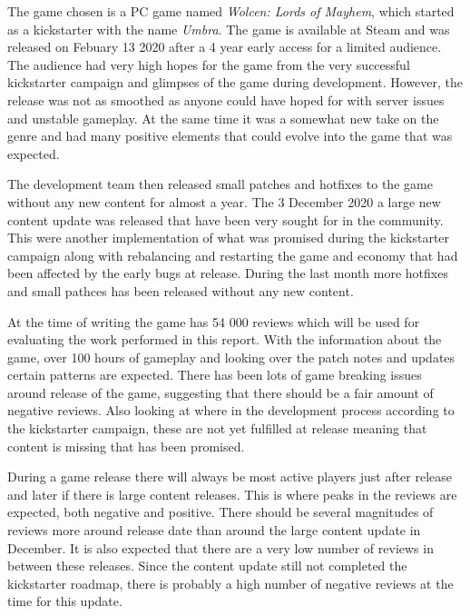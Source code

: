 The game chosen is a PC game named \emph{Wolcen: Lords of Mayhem}, which started as a kickstarter with the name \emph{Umbra}. \cite{kickstarter} 
The game is available at Steam \cite{wolcen} and was released on Febuary 13 2020 after a 4 year early access for a limited audience. 
The audience had very high hopes for the game from the very successful kickstarter campaign and glimpses of the game during development. 
However, the release was not as smoothed as anyone could have hoped for with server issues and unstable gameplay. 
At the same time it was a somewhat new take on the genre and had many positive elements that could evolve into the game that was expected. 


The development team then released small patches and hotfixes to the game without any new content for almost a year. 
The 3 December 2020 a large new content update was released that have been very sought for in the community. 
This were another implementation of what was promised during the kickstarter campaign along with rebalancing and restarting the game and economy that had been affected by the early bugs at release. During the last month more hotfixes and small pathces has been released without any new content.

At the time of writing the game has 54 000 reviews which will be used for evaluating the work performed in this report. 
With the information about the game, over 100 hours of gameplay and looking over the patch notes and updates certain patterns are expected. 
There has been lots of game breaking issues around release of the game, suggesting that there should be a fair amount of negative reviews. 
Also looking at where in the development process according to the kickstarter campaign, these are not yet fulfilled at release meaning that content is missing that has been promised. 

During a game release there will always be most active players just after release and later if there is large content releases. 
This is where peaks in the reviews are expected, both negative and positive. 
There should be several magnitudes of reviews more around release date than around the large content update in December. 
It is also expected that there are a very low number of reviews in between these releases. 
Since the content update still not completed the kickstarter roadmap, there is probably a high number of negative reviews at the time for this update.
